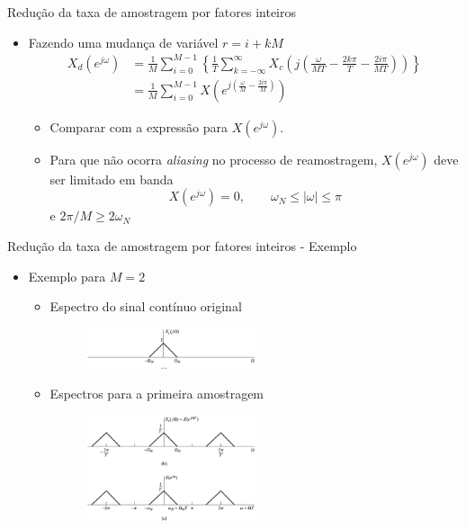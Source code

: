 \documentclass[
size=11pt,
paper=screen,
mode=present,
display=slidesnotes,
style=paintings,
nopagebreaks,
blackslide,
fleqn]{powerdot}
\begin{document}
\begin{slide}{Redução da taxa de amostragem por fatores inteiros}
	\begin{itemize}
		\item Fazendo uma mudança de variável $ r = i + kM$
			\begin{align*}
				X_d(e^{j\omega})& = \frac{1}{M}\sum_{i=0}^{M-1}\left \{\frac{1}{T}\sum_{k=-\infty}^{\infty}X_c\left(j\left(\frac{\omega}{MT}-\frac{2k\pi}{T}-\frac{2i\pi}{MT}\right )\right )\right \}\\
				& = \frac{1}{M}\sum_{i=0}^{M-1}X\left (e^{j\left (\frac{\omega}{M}-\frac{2i\pi}{M}\right )}\right )
			\end{align*}
			\begin{itemize}
				\item Comparar com a expressão para $X(e^{j\omega})$.
				\item Para que não ocorra \emph{aliasing} no processo de reamostragem, $X(e^{j\omega})$ deve ser limitado em banda
					\begin{equation*}
						X(e^{j\omega})= 0, \qquad \omega_N \leq |\omega| \leq \pi
					\end{equation*}
					e  $2\pi/M \geq 2 \omega_N$
			\end{itemize}
	\end{itemize}
\end{slide}

\begin{slide}{Redução da taxa de amostragem por fatores inteiros - Exemplo}
	\begin{itemize}
		\item Exemplo para $M=2$
			\begin{itemize}
				\item Espectro do sinal contínuo original
			\begin{figure}
				\centering
				\includegraphics[width=0.5\textwidth]{figs/4-20a.eps}
		        \end{figure}
		\item Espectros para a primeira amostragem 
			\begin{figure}
				\centering
				\includegraphics[width=0.5\textwidth]{figs/4-20bc.eps}
		        \end{figure}
			\end{itemize}
	\end{itemize}
\end{slide}
\end{document}
